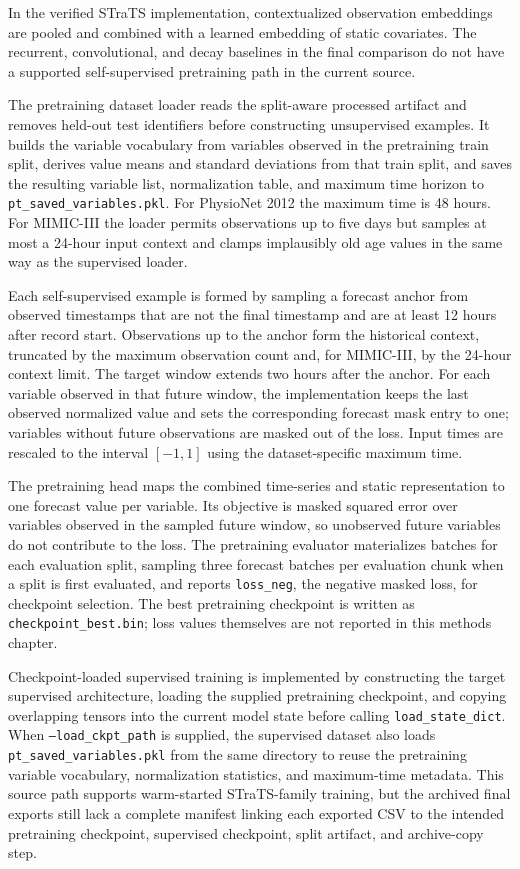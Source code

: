 In the verified STraTS implementation, contextualized observation embeddings are pooled and combined with a learned embedding of static covariates.  The recurrent, convolutional, and decay baselines in the final comparison do not have a supported self-supervised pretraining path in the current source.

The pretraining dataset loader reads the split-aware processed artifact and removes held-out test identifiers before constructing unsupervised examples.  It builds the variable vocabulary from variables observed in the pretraining train split, derives value means and standard deviations from that train split, and saves the resulting variable list, normalization table, and maximum time horizon to \texttt{pt\_saved\_variables.pkl}.  For PhysioNet 2012 the maximum time is 48 hours.  For MIMIC-III the loader permits observations up to five days but samples at most a 24-hour input context and clamps implausibly old age values in the same way as the supervised loader.

Each self-supervised example is formed by sampling a forecast anchor from observed timestamps that are not the final timestamp and are at least 12 hours after record start.  Observations up to the anchor form the historical context, truncated by the maximum observation count and, for MIMIC-III, by the 24-hour context limit.  The target window extends two hours after the anchor.  For each variable observed in that future window, the implementation keeps the last observed normalized value and sets the corresponding forecast mask entry to one; variables without future observations are masked out of the loss.  Input times are rescaled to the interval \([-1,1]\) using the dataset-specific maximum time.

The pretraining head maps the combined time-series and static representation to one forecast value per variable.  Its objective is masked squared error over variables observed in the sampled future window, so unobserved future variables do not contribute to the loss.  The pretraining evaluator materializes batches for each evaluation split, sampling three forecast batches per evaluation chunk when a split is first evaluated, and reports \texttt{loss\_neg}, the negative masked loss, for checkpoint selection.  The best pretraining checkpoint is written as \texttt{checkpoint\_best.bin}; loss values themselves are not reported in this methods chapter.

Checkpoint-loaded supervised training is implemented by constructing the target supervised architecture, loading the supplied pretraining checkpoint, and copying overlapping tensors into the current model state before calling \texttt{load\_state\_dict}.  When \texttt{--load\_ckpt\_path} is supplied, the supervised dataset also loads \texttt{pt\_saved\_variables.pkl} from the same directory to reuse the pretraining variable vocabulary, normalization statistics, and maximum-time metadata.  This source path supports warm-started STraTS-family training, but the archived final exports still lack a complete manifest linking each exported CSV to the intended pretraining checkpoint, supervised checkpoint, split artifact, and archive-copy step.

